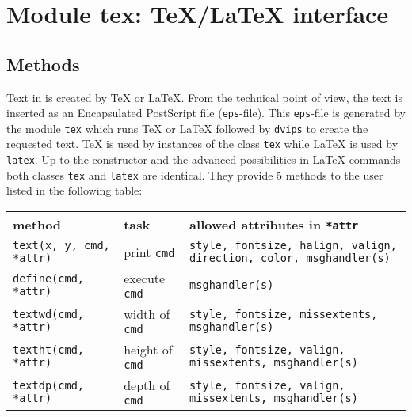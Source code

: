 \chapter{Module tex: \TeX/\LaTeX{} interface}
\label{tex}
\section{Methods}
Text in \PyX{} is created by \TeX{} or \LaTeX. From the technical point
of view, the text is inserted as an Encapsulated PostScript file
(\verb|eps|-file). This \verb|eps|-file is generated by the module
\verb|tex| which runs \TeX{} or \LaTeX{} followed by \verb|dvips| to
create the requested text. \TeX{} is used by instances of the class
\verb|tex| while \LaTeX{} is used by \verb|latex|. Up to the
constructor and the advanced possibilities in \LaTeX{} commands both
classes \verb|tex| and \verb|latex| are identical. They provide 5
methods to the user listed in the following table:

\smallskip
\begin{tabularx}{\linewidth}{ll>{\raggedright\arraybackslash}X}
method&task&allowed attributes in \texttt{*attr}\\
\hline
\texttt{text(x, y, cmd, *attr)}&print \texttt{cmd}&\texttt{style, fontsize, halign, valign, direction, color, msghandler(s)}\\
\texttt{define(cmd, *attr)}&execute \texttt{cmd}&\texttt{msghandler(s)}\\
\texttt{textwd(cmd, *attr)}&width of \texttt{cmd}&\texttt{style, fontsize, missextents, msghandler(s)}\\
\texttt{textht(cmd, *attr)}&height of \texttt{cmd}&\texttt{style, fontsize, valign, missextents, msghandler(s)}\\
\texttt{textdp(cmd, *attr)}&depth of \texttt{cmd}&\texttt{style, fontsize, valign, missextents, msghandler(s)}\\
\end{tabularx}
\smallskip

